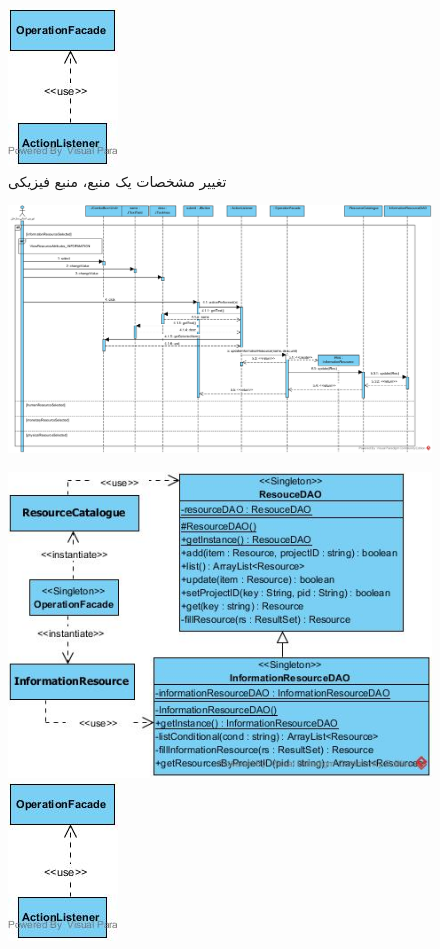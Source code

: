 \begin{landscape}
\begin{figure}[H]
	\includegraphics[scale=0.6]{img/sequence-design/EditResourceAttributes_PHYSICALUI}
	\caption{تغییر مشخصات یک منبع، منبع فیزیکی}
\end{figure}
\begin{figure}[H]
	\centering
	\includegraphics[scale=0.6]{img/sequence-design/EditResourceAttributes_INFORMATION}
\end{figure}
\begin{figure}[H]
	\centering
	\includegraphics[scale=0.6]{img/sequence-design/EditResourceAttributes_INFORMATIONC}
	\includegraphics[scale=0.6]{img/sequence-design/EditResourceAttributes_INFORMATIONUI}

\end{figure}
\end{landscape}
